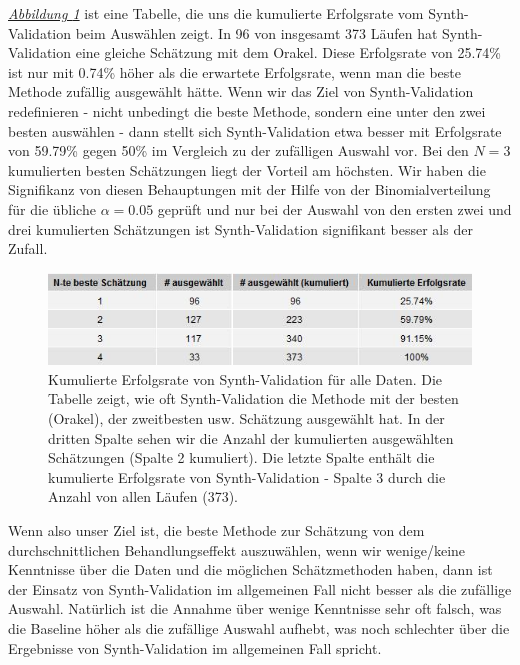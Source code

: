 \documentclass[12pt,a4paper,twoside]{scrartcl}
\numberwithin{equation}{section}
\newcommand{\reffig}[1]{\emph{\hyperref[#1]{Abbildung \ref*{#1}}}}
\begin{document}
\noindent
\reffig{fig:allRunsGrid} ist eine Tabelle, die uns die kumulierte Erfolgsrate vom Synth-Validation beim Auswählen zeigt. In 96 von insgesamt 373 Läufen hat Synth-Validation eine gleiche Schätzung mit dem Orakel. Diese Erfolgsrate von 25.74\% ist nur mit 0.74\% höher als die erwartete Erfolgsrate, wenn man die beste Methode zufällig ausgewählt hätte. Wenn wir das Ziel von Synth-Validation redefinieren - nicht unbedingt die beste Methode, sondern eine unter den zwei besten auswählen - dann stellt sich Synth-Validation etwa besser mit Erfolgsrate von 59.79\% gegen 50\% im Vergleich zu der zufälligen Auswahl vor. Bei den $N=3$ kumulierten besten Schätzungen liegt der Vorteil am höchsten. Wir haben die Signifikanz von diesen Behauptungen mit der Hilfe von der Binomialverteilung für die übliche $\alpha = 0.05$ geprüft und nur bei der Auswahl von den ersten zwei und drei kumulierten Schätzungen ist Synth-Validation signifikant besser als der Zufall. \par

\begin{center}
\begin{figure}[h]
    \centering
    \includegraphics[height=0.2\textwidth, width=1\textwidth]{figures/plots/allRunsGrid.jpeg}
   \vspace{1mm} 
    \caption[Kumulierte Erfolgsrate von Synth-Validation für alle Daten]{Kumulierte Erfolgsrate von Synth-Validation für alle Daten. Die Tabelle zeigt, wie oft Synth-Validation die Methode mit der besten (Orakel), der zweitbesten usw. Schätzung ausgewählt hat. In der dritten Spalte sehen wir die Anzahl der kumulierten ausgewählten Schätzungen (Spalte 2 kumuliert). Die letzte Spalte enthält die kumulierte Erfolgsrate von Synth-Validation - Spalte 3 durch die Anzahl von allen Läufen (373).}\label{fig:allRunsGrid}
  \end{figure}
\end{center}

\noindent
Wenn also unser Ziel ist, die beste Methode zur Schätzung von dem durchschnittlichen Behandlungseffekt auszuwählen, wenn wir wenige/keine Kenntnisse über die Daten und die möglichen Schätzmethoden haben, dann ist der Einsatz von Synth-Validation im allgemeinen Fall nicht besser als die zufällige Auswahl. Natürlich ist die Annahme über wenige Kenntnisse sehr oft falsch, was die Baseline höher als die zufällige Auswahl aufhebt, was noch schlechter über die Ergebnisse von Synth-Validation im allgemeinen Fall spricht.\par
\end{document}
